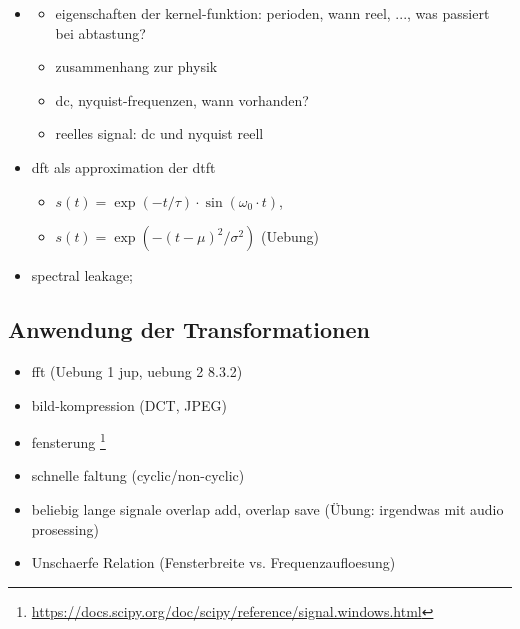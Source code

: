 \begin{itemize}
    \item \begin{itemize}
        \item eigenschaften der kernel-funktion: perioden, wann reel, ..., was passiert bei abtastung?
        \item zusammenhang zur physik
        \item dc, nyquist-frequenzen, wann vorhanden?
        \item reelles signal: dc und nyquist reell
    \end{itemize}
    \item dft als approximation der dtft
    \begin{itemize}
        \item $s(t) = \exp(-t/\tau) \cdot \sin(\omega_0 \cdot t)$, 
        \item $s(t) = \exp(-(t - \mu)^2/\sigma^2)$ (Uebung)
    \end{itemize}
    \item spectral leakage;
\end{itemize}
\subsection{Anwendung der Transformationen}
\begin{itemize}
    \item fft (Uebung 1 jup, uebung 2 8.3.2)
    \item bild-kompression (DCT, JPEG)
    \item fensterung \footnote{\url{https://docs.scipy.org/doc/scipy/reference/signal.windows.html}}
    \item schnelle faltung (cyclic/non-cyclic)
    \item beliebig lange signale overlap add, overlap save (\"Ubung: irgendwas mit audio prosessing)
    \item Unschaerfe Relation (Fensterbreite vs. Frequenzaufloesung)\cite[chpt. 4.2]{mallat2008wavelets}
\end{itemize}

